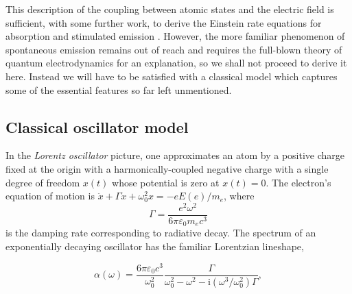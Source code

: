 
	This description of the coupling between atomic states and the electric field is sufficient, with some further work, to derive the Einstein rate equations for absorption and stimulated emission \cite{FootAtomic}.
	However, the more familiar phenomenon of spontaneous emission remains out of reach and requires the full-blown theory of quantum electrodynamics for an explanation, so we shall not proceed to derive it here.
	Instead we will have to be satisfied with a classical model which captures some of the essential features so far left unmentioned.



	\subsection*{Classical oscillator model}

	In the \emph{Lorentz oscillator} picture, one approximates an atom by a positive charge fixed at the origin with a harmonically-coupled negative charge with a single degree of freedom $x(t)$ whose potential is zero at $x(t)=0$.
	The electron's equation of motion is $\ddot{x} + \Gamma\dot{x} + \omega_0^2x = -e E(e)/m_e$, where
	\begin{equation}
		\Gamma = \frac{e^2\omega^2}{6\pi \varepsilon_0 m_e c^3}
	\end{equation}
	is the damping rate corresponding to radiative decay.
	The spectrum of an exponentially decaying oscillator has the familiar Lorentzian lineshape,

	\begin{equation}
		\alpha(\omega) = \frac{6\pi\varepsilon_0c^3}{\omega_0^2}\frac{\Gamma}{\omega_0^2-\omega^2-\textrm{i}(\omega^3/\omega_0^2)\Gamma},
	\end{equation}

